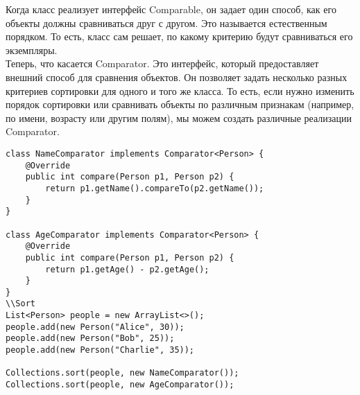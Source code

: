 {\begin{lstlisting}
\end{lstlisting}
Когда класс реализует интерфейс Comparable, он задает один способ, как его объекты должны сравниваться друг с другом. Это называется естественным порядком. То есть, класс сам решает, по какому критерию будут сравниваться его экземпляры. \\
Теперь, что касается Comparator. Это интерфейс, который предоставляет внешний способ для сравнения объектов. Он позволяет задать несколько разных критериев сортировки для одного и того же класса. То есть, если нужно изменить порядок сортировки или сравнивать объекты по различным признакам (например, по имени, возрасту или другим полям), мы можем создать различные реализации Comparator.
\begin{lstlisting}
class NameComparator implements Comparator<Person> {
    @Override
    public int compare(Person p1, Person p2) {
        return p1.getName().compareTo(p2.getName()); 
    }
}

class AgeComparator implements Comparator<Person> {
    @Override
    public int compare(Person p1, Person p2) {
        return p1.getAge() - p2.getAge();
    }
}
\\Sort
List<Person> people = new ArrayList<>();
people.add(new Person("Alice", 30));
people.add(new Person("Bob", 25));
people.add(new Person("Charlie", 35));

Collections.sort(people, new NameComparator()); 
Collections.sort(people, new AgeComparator()); 

\end{lstlisting}
}
